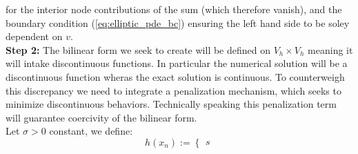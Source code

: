 for the interior node contributions of the sum (which therefore vanish), and the boundary condition (\ref{eq:elliptic_pde_bc}) 
ensuring the left hand side to be soley dependent on $v$.\\
\textbf{Step 2:} The bilinear form we seek to create will be defined on $V_h\times V_h$
meaning it will intake discontinuous functions. In particular the numerical
solution will be a discontinuous function wheras the exact solution is continuous.
To counterweigh this discrepancy we need to integrate a penalization mechanism, which seeks to 
minimize discontinuous behaviors. Technically speaking this penalization term 
will guarantee coercivity of the bilinear form. \\
Let $\sigma > 0$ constant, we define:
\begin{equation*}
    h(x_n) := 
    \begin{cases}
        s
    \end{cases}
\end{equation*}